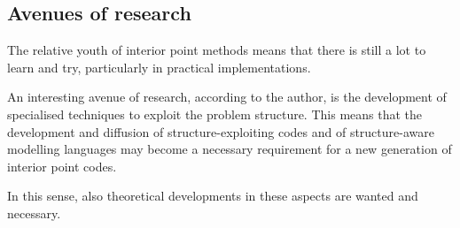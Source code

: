%
%
\subsection*{Avenues of research}

The relative youth of interior point methods means that there is still
a lot to learn and try, particularly in practical implementations.

An interesting avenue of research, according to the author, is the development
of specialised techniques to exploit the problem structure.
This means that the development and diffusion of structure-exploiting
codes and of structure-aware modelling languages may become a necessary
requirement for a new generation of interior point codes.

In this sense, also theoretical developments in these aspects are 
wanted and necessary.
